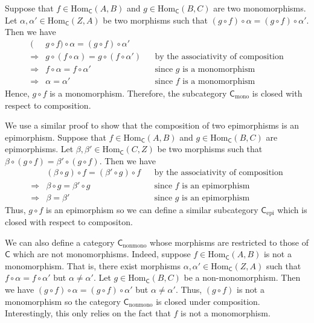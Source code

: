 \documentclass[../../master.tex]{subfiles}
\begin{document}
    \begin{solution}
      Suppose that \(f \in \text{Hom}_{\mathsf{C}}(A, B)\) and \(g \in \text{Hom}_{\mathsf{C}}(B, C)\) are two monomorphisms.
      Let \(\alpha, \alpha' \in \text{Hom}_{\mathsf{C}}(Z, A)\) be two morphisms such that \((g \circ f) \circ \alpha = (g \circ f) \circ \alpha'\).
      Then we have
      \begin{align*}
        (&g \circ f) \circ \alpha = (g \circ f) \circ \alpha' \\
        \Longrightarrow &g \circ (f \circ \alpha) = g \circ (f \circ \alpha') && \text{by the associativity of composition} \\
        \Longrightarrow &f \circ \alpha = f \circ \alpha' && \text{since \(g\) is a monomorphism} \\
        \Longrightarrow &\alpha = \alpha' && \text{since \(f\) is a monomorphism}
      \end{align*}
      Hence, \(g \circ f\) is a monomorphism.
      Therefore, the subcategory \(\mathsf{C}_{\text{mono}}\) is closed with respect to composition.

      We use a similar proof to show that the composition of two epimorphisms is an epimorphism.
      Suppose that \(f \in \text{Hom}_{\mathsf{C}}(A, B)\) and \(g \in \text{Hom}_{\mathsf{C}}(B, C)\) are epimorphisms.
      Let \(\beta, \beta' \in \text{Hom}_{\mathsf{C}}(C, Z)\) be two morphisms such that \(\beta \circ (g \circ f) = \beta' \circ (g \circ f)\).
      Then we have
      \begin{align*}
        &(\beta \circ g) \circ f = (\beta' \circ g) \circ f && \text{by the associativity of composition} \\
        \Longrightarrow &\beta \circ g = \beta' \circ g && \text{since \(f\) is an epimorphism} \\
        \Longrightarrow &\beta = \beta' && \text{since \(g\) is an epimorphism}
      \end{align*}
      Thus, \(g \circ f\) is an epimorphism so we can define a similar subcategory \(\mathsf{C}_{\text{epi}}\) which is closed with respect to compositon.

      We can also define a category \(\mathsf{C}_{\text{nonmono}}\) whose morphisms are restricted to those of \(\mathsf{C}\) which are not monomorphisms.
      Indeed, suppose \(f \in \text{Hom}_{\mathsf{C}}(A, B)\) is not a monomorphism.
      That is, there exist morphisms \(\alpha, \alpha' \in \text{Hom}_{\mathsf{C}}(Z, A)\) such that \(f \circ \alpha = f \circ \alpha'\) but \(\alpha \neq \alpha'\).
      Let \(g \in \text{Hom}_{\mathsf{C}}(B, C)\) be a non-monomorphism.
      Then we have \((g \circ f) \circ \alpha = (g \circ f) \circ \alpha'\) but \(\alpha \neq \alpha'\).
      Thus, \((g \circ f)\) is not a monomorphism so the category \(\mathsf{C}_{\text{nonmono}}\) is closed under composition.
      Interestingly, this only relies on the fact that \(f\) is not a monomorphism.
    \end{solution}
\end{document}
